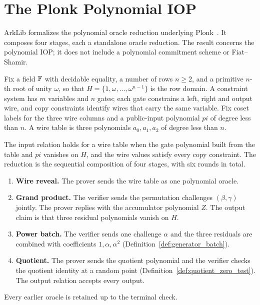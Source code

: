 
\section{The Plonk Polynomial IOP}\label{sec:plonk}

ArkLib formalizes the polynomial oracle reduction underlying Plonk~\cite{GWZC19}. It
composes four stages, each a standalone oracle reduction. The result concerns the
polynomial IOP; it does not include a polynomial commitment scheme or Fiat--Shamir.

Fix a field $\mathbb{F}$ with decidable equality, a number of rows $n\geq 2$, and a primitive
$n$-th root of unity $\omega$, so that $H=\{1,\omega,\ldots,\omega^{n-1}\}$ is the row
domain. A constraint system has $m$ variables and $n$ gates; each gate constrains a left,
right and output wire, and copy constraints identify wires that carry the same variable.
Fix coset labels for the three wire columns and a public-input polynomial $\mathit{pi}$ of
degree less than $n$. A wire table is three polynomials $a_0,a_1,a_2$ of degree less than
$n$.

\begin{definition}\label{def:plonk_assembly}
\leanok
{}
The input relation holds for a wire table when the gate polynomial built from the table and
$\mathit{pi}$ vanishes on $H$, and the wire values satisfy every copy constraint. The
reduction is the sequential composition of four stages, with six rounds in total.
\begin{enumerate}
  \item \textbf{Wire reveal.} The prover sends the wire table as one polynomial oracle.
  \item \textbf{Grand product.} The verifier sends the permutation challenges
    $(\beta,\gamma)$ jointly. The prover replies with the accumulator polynomial $Z$.
    The output claim is that three residual polynomials vanish on $H$.
  \item \textbf{Power batch.} The verifier sends one challenge $\alpha$ and the three
    residuals are combined with coefficients $1,\alpha,\alpha^2$
    (Definition~\ref{def:generator_batch}).
  \item \textbf{Quotient.} The prover sends the quotient polynomial and the verifier
    checks the quotient identity at a random point
    (Definition~\ref{def:quotient_zero_test}). The output relation accepts every output.
\end{enumerate}
Every earlier oracle is retained up to the terminal check.
\end{definition}

